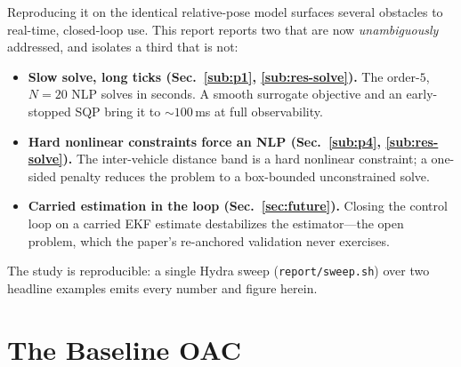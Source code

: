 \documentclass[11pt]{article}
\newcommand{\code}[1]{\texttt{\small #1}}
\begin{document}
Reproducing it on the identical relative-pose model surfaces several obstacles to real-time,
closed-loop use. This report reports two that are now \emph{unambiguously} addressed, and isolates
a third that is not:
\begin{itemize}[leftmargin=1.6em,itemsep=2pt]
  \item \textbf{Slow solve, long ticks (Sec.~\ref{sub:p1}, \ref{sub:res-solve}).} The order-$5$,
    $N=20$ NLP solves in seconds. A smooth surrogate objective and an early-stopped SQP bring it
    to $\sim\!100$\,ms at full observability.
  \item \textbf{Hard nonlinear constraints force an NLP (Sec.~\ref{sub:p4},
    \ref{sub:res-solve}).} The inter-vehicle distance band is a hard nonlinear constraint; a
    one-sided penalty reduces the problem to a box-bounded unconstrained solve.
  \item \textbf{Carried estimation in the loop (Sec.~\ref{sec:future}).} Closing the control loop
    on a carried EKF estimate destabilizes the estimator---the open problem, which the paper's
    re-anchored validation never exercises.
\end{itemize}
The study is reproducible: a single Hydra sweep (\code{report/sweep.sh}) over two headline
examples emits every number and figure herein.

\section{The Baseline OAC}\label{sec:baseline}
\end{document}
